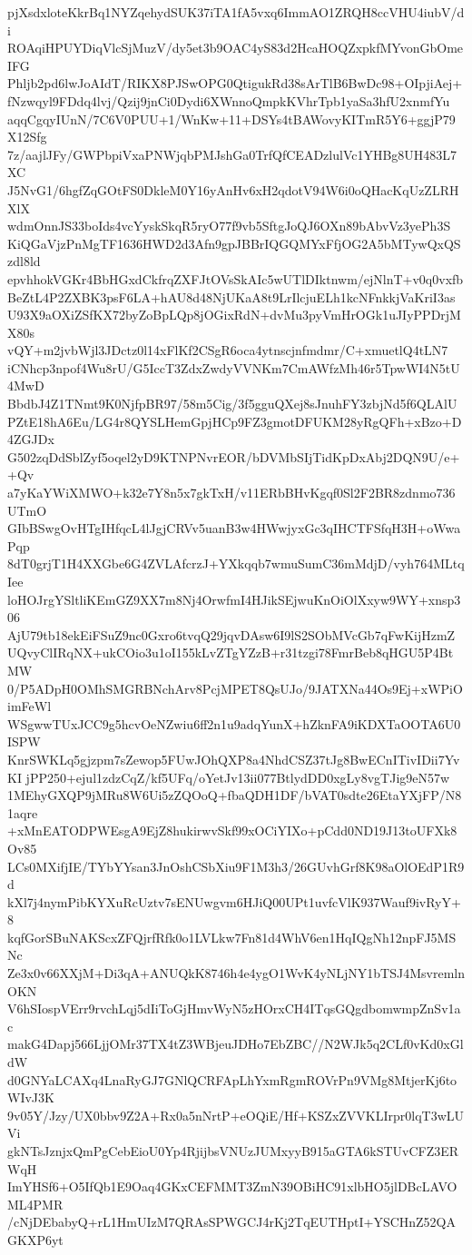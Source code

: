 pjXsdxloteKkrBq1NYZqehydSUK37iTA1fA5vxq6ImmAO1ZRQH8ccVHU4iubV/di
ROAqiHPUYDiqVlcSjMuzV/dy5et3b9OAC4yS83d2HcaHOQZxpkfMYvonGbOmeIFG
Phljb2pd6lwJoAIdT/RIKX8PJSwOPG0QtigukRd38sArTlB6BwDc98+OIpjiAej+
fNzwqyl9FDdq4lvj/Qzij9jnCi0Dydi6XWnnoQmpkKVhrTpb1yaSa3hfU2xnmfYu
aqqCgqyIUnN/7C6V0PUU+1/WnKw+11+DSYs4tBAWovyKITmR5Y6+ggjP79X12Sfg
7z/aajlJFy/GWPbpiVxaPNWjqbPMJshGa0TrfQfCEADzlulVc1YHBg8UH483L7XC
J5NvG1/6hgfZqGOtFS0DkleM0Y16yAnHv6xH2qdotV94W6i0oQHacKqUzZLRHXlX
wdmOnnJS33boIds4vcYyskSkqR5ryO77f9vb5SftgJoQJ6OXn89bAbvVz3yePh3S
KiQGaVjzPnMgTF1636HWD2d3Afn9gpJBBrIQGQMYxFfjOG2A5bMTywQxQSzdl8ld
epvhhokVGKr4BbHGxdCkfrqZXFJtOVsSkAIc5wUTlDIktnwm/ejNlnT+v0q0vxfb
BeZtL4P2ZXBK3psF6LA+hAU8d48NjUKaA8t9LrIlcjuELh1kcNFnkkjVaKriI3as
U93X9aOXiZSfKX72byZoBpLQp8jOGixRdN+dvMu3pyVmHrOGk1uJIyPPDrjMX80s
vQY+m2jvbWjl3JDctz0l14xFlKf2CSgR6oca4ytnscjnfmdmr/C+xmuetlQ4tLN7
iCNhcp3npof4Wu8rU/G5IccT3ZdxZwdyVVNKm7CmAWfzMh46r5TpwWI4N5tU4MwD
BbdbJ4Z1TNmt9K0NjfpBR97/58m5Cig/3f5gguQXej8sJnuhFY3zbjNd5f6QLAlU
PZtE18hA6Eu/LG4r8QYSLHemGpjHCp9FZ3gmotDFUKM28yRgQFh+xBzo+D4ZGJDx
G502zqDdSblZyf5oqel2yD9KTNPNvrEOR/bDVMbSIjTidKpDxAbj2DQN9U/e++Qv
a7yKaYWiXMWO+k32e7Y8n5x7gkTxH/v11ERbBHvKgqf0Sl2F2BR8zdnmo736UTmO
GIbBSwgOvHTgIHfqcL4lJgjCRVv5uanB3w4HWwjyxGc3qIHCTFSfqH3H+oWwaPqp
8dT0grjT1H4XXGbe6G4ZVLAfcrzJ+YXkqqb7wmuSumC36mMdjD/vyh764MLtqIee
loHOJrgYSltliKEmGZ9XX7m8Nj4OrwfmI4HJikSEjwuKnOiOlXxyw9WY+xnsp306
AjU79tb18ekEiFSuZ9nc0Gxro6tvqQ29jqvDAsw6I9lS2SObMVcGb7qFwKijHzmZ
UQvyClIRqNX+ukCOio3u1oI155kLvZTgYZzB+r31tzgi78FmrBeb8qHGU5P4BtMW
0/P5ADpH0OMhSMGRBNchArv8PcjMPET8QsUJo/9JATXNa44Os9Ej+xWPiOimFeWl
WSgwwTUxJCC9g5hcvOeNZwiu6ff2n1u9adqYunX+hZknFA9iKDXTaOOTA6U0ISPW
KnrSWKLq5gjzpm7sZewop5FUwJOhQXP8a4NhdCSZ37tJg8BwECnITivIDii7YvKI
jPP250+ejul1zdzCqZ/kf5UFq/oYetJv13ii077BtlydDD0xgLy8vgTJig9eN57w
1MEhyGXQP9jMRu8W6Ui5zZQOoQ+fbaQDH1DF/bVAT0sdte26EtaYXjFP/N81aqre
+xMnEATODPWEsgA9EjZ8hukirwvSkf99xOCiYIXo+pCdd0ND19J13toUFXk8Ov85
LCs0MXifjIE/TYbYYsan3JnOshCSbXiu9F1M3h3/26GUvhGrf8K98aOlOEdP1R9d
kXl7j4nymPibKYXuRcUztv7sENUwgvm6HJiQ00UPt1uvfcVlK937Wauf9ivRyY+8
kqfGorSBuNAKScxZFQjrfRfk0o1LVLkw7Fn81d4WhV6en1HqIQgNh12npFJ5MSNc
Ze3x0v66XXjM+Di3qA+ANUQkK8746h4e4ygO1WvK4yNLjNY1bTSJ4MsvremlnOKN
V6hSIospVErr9rvchLqj5dIiToGjHmvWyN5zHOrxCH4ITqsGQgdbomwmpZnSv1ac
makG4Dapj566LjjOMr37TX4tZ3WBjeuJDHo7EbZBC//N2WJk5q2CLf0vKd0xGldW
d0GNYaLCAXq4LnaRyGJ7GNlQCRFApLhYxmRgmROVrPn9VMg8MtjerKj6toWIvJ3K
9v05Y/Jzy/UX0bbv9Z2A+Rx0a5nNrtP+eOQiE/Hf+KSZxZVVKLIrpr0lqT3wLUVi
gkNTsJznjxQmPgCebEioU0Yp4RjijbsVNUzJUMxyyB915aGTA6kSTUvCFZ3ERWqH
ImYHSf6+O5IfQb1E9Oaq4GKxCEFMMT3ZmN39OBiHC91xlbHO5jlDBcLAVOML4PMR
/cNjDEbabyQ+rL1HmUIzM7QRAsSPWGCJ4rKj2TqEUTHptI+YSCHnZ52QAGKXP6yt
